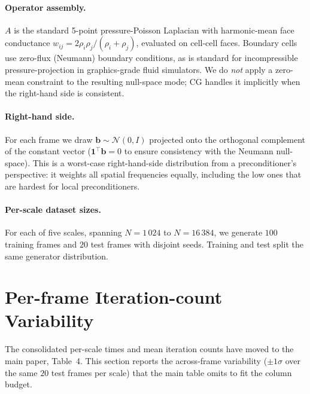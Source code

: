 \documentclass[acmtog,anonymous,review]{acmart}
\begin{document}
\paragraph{Operator assembly.}
$A$ is the standard 5-point pressure-Poisson Laplacian with harmonic-mean face
conductance $w_{ij}\!=\!2\rho_i\rho_j/(\rho_i\!+\!\rho_j)$, evaluated on
cell-cell faces. Boundary cells use zero-flux (Neumann) boundary conditions, as
is standard for incompressible pressure-projection in graphics-grade fluid
simulators. We do \emph{not} apply a zero-mean constraint to the resulting
null-space mode; CG handles it implicitly when the right-hand side is consistent.

\paragraph{Right-hand side.}
For each frame we draw $\mathbf{b}\!\sim\!\mathcal{N}(0, I)$ projected onto the
orthogonal complement of the constant vector ($\mathbf{1}^\top\mathbf{b}\!=\!0$
to ensure consistency with the Neumann null-space). This is a worst-case
right-hand-side distribution from a preconditioner's perspective: it weights all
spatial frequencies equally, including the low ones that are hardest for local
preconditioners.

\paragraph{Per-scale dataset sizes.}
For each of five scales, spanning $N=1\,024$ to $N=16\,384$, we generate
$100$ training frames and $20$ test frames with disjoint seeds.
Training and test split the same generator distribution.

\section{Per-frame Iteration-count Variability}
\label{supp:full_perf_table}

The consolidated per-scale times and mean iteration counts have moved to the
main paper, Table~4. This section reports the across-frame variability
($\pm 1\sigma$ over the same $20$ test frames per scale) that the main table
omits to fit the column budget.
\end{document}
